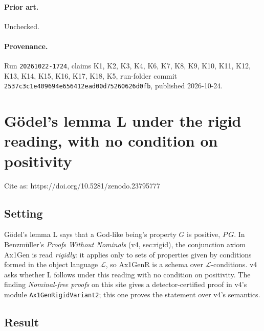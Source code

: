 \documentclass{article}
\begin{document}
\paragraph{Prior art.} Unchecked.

\paragraph{Provenance.}
Run \texttt{20261022-1724}, claims K1, K2, K3, K4, K6, K7, K8, K9, K10, K11, K12, K13, K14, K15, K16, K17, K18, K5, run-folder commit \texttt{2537c3c1e409694e656412ead00d75260626d0fb}, published 2026-10-24.

\section{Gödel's lemma L under the rigid reading, with no condition on positivity}
\label{sec:ontological-rigid-l}

Cite as: https://doi.org/10.5281/zenodo.23795777

\subsection*{Setting}

Gödel's lemma L says that a God-like being's property $G$ is positive, $P\,G$. In
Benzmüller's \emph{Proofs Without Nominals} \cite{benzmueller2026nominals} (v4, sec:rigid), the
conjunction axiom Ax1Gen is read \emph{rigidly}: it applies only to sets of properties given by
conditions formed in the object language $\mathcal L$, so Ax1GenR is a schema over
$\mathcal L$-conditions. v4 asks whether L follows under this reading with no condition on
positivity. The finding \emph{Nominal-free proofs} on this site gives a detector-certified proof in
v4's module \texttt{Ax1GenRigidVariant2}; this one proves the statement over v4's semantics.

\subsection*{Result}
\end{document}
